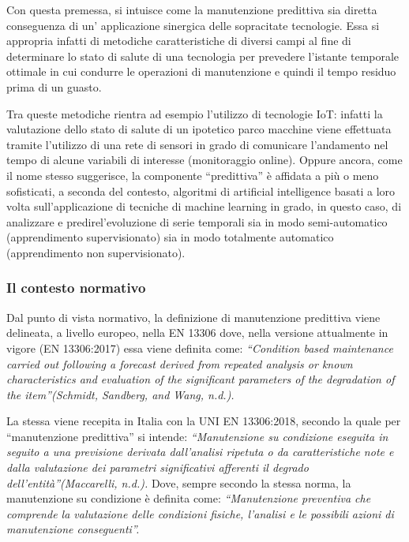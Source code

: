 \documentclass[10pt,]{article}
\begin{document}
Con questa premessa, si intuisce come la manutenzione predittiva sia
diretta conseguenza di un' applicazione sinergica delle sopracitate
tecnologie. Essa si appropria infatti di metodiche caratteristiche di
diversi campi al fine di determinare lo stato di salute di una
tecnologia per prevedere l'istante temporale ottimale in cui condurre le
operazioni di manutenzione e quindi il tempo residuo prima di un guasto.

Tra queste metodiche rientra ad esempio l'utilizzo di tecnologie IoT:
infatti la valutazione dello stato di salute di un ipotetico parco
macchine viene effettuata tramite l'utilizzo di una rete di sensori in
grado di comunicare l'andamento nel tempo di alcune variabili di
interesse (monitoraggio online). Oppure ancora, come il nome stesso
suggerisce, la componente ``predittiva'' è affidata a più o meno
sofisticati, a seconda del contesto, algoritmi di artificial
intelligence basati a loro volta sull'applicazione di tecniche di
machine learning in grado, in questo caso, di analizzare e
predirel'evoluzione di serie temporali sia in modo semi-automatico
(apprendimento supervisionato) sia in modo totalmente automatico
(apprendimento non supervisionato).

\subsubsection{Il contesto normativo}\label{il-contesto-normativo}

Dal punto di vista normativo, la definizione di manutenzione predittiva
viene delineata, a livello europeo, nella EN 13306 dove, nella versione
attualmente in vigore (EN 13306:2017) essa viene definita come:
\emph{``Condition based maintenance carried out following a forecast
derived from repeated analysis or known characteristics and evaluation
of the significant parameters of the degradation of the item''(Schmidt,
Sandberg, and Wang, n.d.).}

La stessa viene recepita in Italia con la UNI EN 13306:2018, secondo la
quale per ``manutenzione predittiva'' si intende: \emph{``Manutenzione
su condizione eseguita in seguito a una previsione derivata dall'analisi
ripetuta o da caratteristiche note e dalla valutazione dei parametri
significativi afferenti il degrado dell'entità''(Maccarelli, n.d.).}
Dove, sempre secondo la stessa norma, la manutenzione su condizione è
definita come: \emph{``Manutenzione preventiva che comprende la
valutazione delle condizioni fisiche, l'analisi e le possibili azioni di
manutenzione conseguenti''.}
\end{document}

